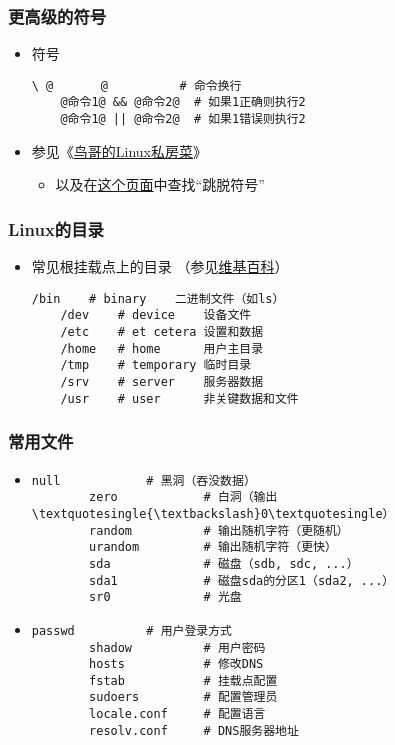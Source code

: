 \begin{CJK}{UTF8}{gbsn}
\begin{frame} [fragile]
	\frametitle{更高级的符号}
	\linespread{1.5}
	\begin{itemize}
	\item 符号
	\begin{lstlisting}[style=bashstyle, gobble=4, texcl, escapechar=@]
	\ @　　　　@		  # 命令换行
	@命令1@ && @命令2@	# 如果1正确则执行2
	@命令1@ || @命令2@	# 如果1错误则执行2
	\end{lstlisting}
	\item 参见《\href{http://cn.linux.vbird.org/linux\_basic/0320bash\_5.php}
					{鸟哥的Linux私房菜}》
		\begin{itemize}
		\item 以及在\href{http://cn.linux.vbird.org/linux\_basic/0320bash\_2.php}
						{这个页面}中查找``跳脱符号''
		\end{itemize}
	\end{itemize}
\end{frame}

\begin{frame} [fragile]
	\frametitle{Linux的目录}
	\linespread{1.25}
	\begin{itemize}
	\item 常见根挂载点上的目录
		（参见\href{https://en.wikipedia.org/wiki/Unix\_filesystem}{维基百科}）
	\begin{lstlisting}[style=bashstyle, gobble=4, texcl,
						escapebegin=\obeyspaces]
	/bin	# binary    二进制文件（如ls）
	/dev	# device    设备文件
	/etc	# et cetera 设置和数据
	/home	# home      用户主目录
	/tmp	# temporary 临时目录
	/srv	# server    服务器数据
	/usr	# user      非关键数据和文件
	\end{lstlisting}
	\end{itemize}
\end{frame}

\begin{frame} [fragile]
	\frametitle{常用文件}
	\small
	\begin{itemize}
	\item {}
		\begin{lstlisting}[style=bashstyle, gobble=8, texcl, escapechar=@]
		null			# 黑洞（吞没数据）
		zero			# 白洞（输出\textquotesingle{\textbackslash}0\textquotesingle）
		random			# 输出随机字符（更随机）
		urandom			# 输出随机字符（更快）
		sda				# 磁盘（sdb, sdc, ...）
		sda1			# 磁盘sda的分区1（sda2, ...）
		sr0				# 光盘
		\end{lstlisting}
	\item {}
		\begin{lstlisting}[style=bashstyle, gobble=8, texcl, escapechar=@]
		passwd			# 用户登录方式
		shadow			# 用户密码
		hosts			# 修改DNS
		fstab			# 挂载点配置
		sudoers			# 配置管理员
		locale.conf		# 配置语言
		resolv.conf		# DNS服务器地址
		\end{lstlisting}
	\end{itemize}
\end{frame}


\end{CJK}
